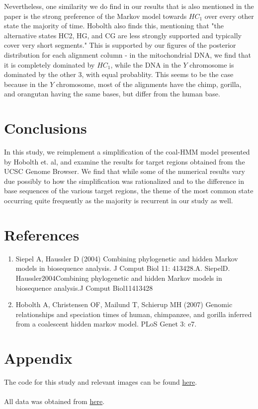 \documentclass[12pt]{article}
\begin{document}
    Nevertheless, one similarity we do find in our results that is also mentioned in the paper is the strong preference of the Markov model towards $HC_1$ over every other state the majority of time. Hobolth also finds this, mentioning that "the alternative states HC2, HG, and CG are less strongly supported and typically cover very short segments." This is supported by our figures of the posterior distribution for each alignment column - in the mitochondrial DNA, we find that it is completely dominated by $HC_1$, while the DNA in the $Y$ chromosome is dominated by the other 3, with equal probablity. This seems to be the case because in the $Y$ chromosome, most of the alignments have the chimp, gorilla, and orangutan having the same bases, but differ from the human base.
    
    \section{Conclusions}
    In this study, we reimplement a simplification of the coal-HMM model presented by Hobolth et. al, and examine the results for target regions obtained from the UCSC Genome Browser. We find that while some of the numerical results vary due possibly to how the simplification was rationalized and to the difference in base sequences of the various target regions, the theme of the most common state occurring quite frequently as the majority is recurrent in our study as well.
    \section{References}
    \begin{enumerate}
    \item Siepel A, Haussler D (2004) Combining phylogenetic and hidden Markov models in biosequence
            analysis. J Comput Biol 11: 413428.A. SiepelD. Haussler2004Combining phylogenetic
            and hidden Markov models in biosequence analysis.J Comput Biol11413428
    \item Hobolth A, Christensen OF, Mailund T, Schierup MH (2007) Genomic relationships and
            speciation times of human, chimpanzee, and gorilla inferred from a coalescent hidden
            markov model. PLoS Genet 3: e7.
    \end{enumerate}
    \section{Appendix}
    The code for this study and relevant images can be found \href{https://github.com/dthiagarajan/coal-hmm-simplification}{here}.
    \\ \\
    All data was obtained from \href{http://hgdownload.soe.ucsc.edu/goldenPath/hg38/multiz20way/}{here}.
    
\end{document}
